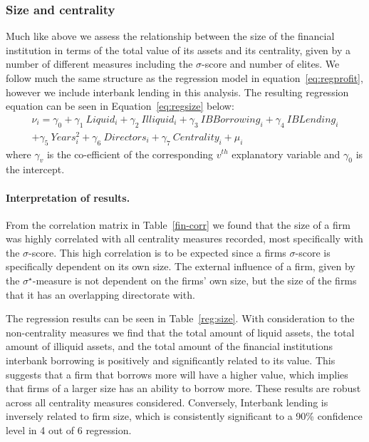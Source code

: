 \documentclass[11pt,fleqn]{article}
\begin{document}
\subsubsection*{Size and centrality}

Much like above we assess the relationship between the size of the financial institution in terms of the total value of its assets and its centrality, given by a number of different measures including the $\sigma$-score and number of elites. We follow much the same structure as the regression model in equation~\ref{eq:regprofit}, however we include interbank lending in this analysis. The resulting regression equation can be seen in Equation~\ref{eq:regsize} below:
\begin{multline} \label{eq:regsize}
\nu_{i} = \gamma_{0} + \gamma_{1}~Liquid_{i} + \gamma_{2}~Illiquid_{i} + \gamma_{3}~IBBorrowing_{i} + \gamma_{4}~IBLending_{i}\\
+ \gamma_{5}~Years^{2}_{i} + \gamma_{6}~Directors_{i} + \gamma_{7}~Centrality_{i} + \mu_{i}
\end{multline}
where $\gamma_{v}$ is the co-efficient of the corresponding $v^{th}$ explanatory variable and $\gamma_{0}$ is the intercept.

\paragraph{Interpretation of results.}

From the correlation matrix in Table~\ref{fin-corr} we found that the size of a firm was highly correlated with all centrality measures recorded, most specifically with the $\sigma$-score. This high correlation is to be expected since a firms $\sigma$-score is specifically dependent on its own size. The external influence of a firm, given by the $\sigma^{\star}$-measure is not dependent on the firms' own size, but the size of the firms that it has an overlapping directorate with.

The regression results can be seen in Table~\ref{reg:size}. With consideration to the non-centrality measures we find that the total amount of liquid assets, the total amount of illiquid assets, and the total amount of the financial institutions interbank borrowing is positively and significantly related to its value. This suggests that a firm that borrows more will have a higher value, which implies that firms of a larger size has an ability to borrow more. These results are robust across all centrality measures considered. Conversely, Interbank lending is inversely related to firm size, which is consistently significant to a 90\% confidence level in 4 out of 6 regression.
\end{document}
